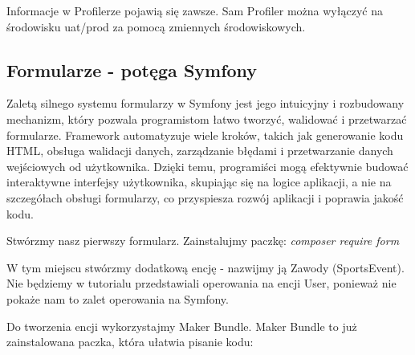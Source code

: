 \documentclass[polish, a4paper]{article}
\begin{document}
Informacje w Profilerze pojawią się zawsze. Sam Profiler można wyłączyć na środowisku uat/prod za pomocą zmiennych środowiskowych.

\subsection{Formularze - potęga Symfony}

Zaletą silnego systemu formularzy w Symfony jest jego intuicyjny i rozbudowany mechanizm, który pozwala programistom łatwo tworzyć, walidować i przetwarzać formularze. Framework automatyzuje wiele kroków, takich jak generowanie kodu HTML, obsługa walidacji danych, zarządzanie błędami i przetwarzanie danych wejściowych od użytkownika. Dzięki temu, programiści mogą efektywnie budować interaktywne interfejsy użytkownika, skupiając się na logice aplikacji, a nie na szczegółach obsługi formularzy, co przyspiesza rozwój aplikacji i poprawia jakość kodu.

Stwórzmy nasz pierwszy formularz. Zainstalujmy paczkę: \emph{composer require form}

W tym miejscu stwórzmy dodatkową encję - nazwijmy ją Zawody (SportsEvent). Nie będziemy w tutorialu przedstawiali operowania na encji User, ponieważ nie pokaże nam to zalet operowania na Symfony.

Do tworzenia encji wykorzystajmy Maker Bundle. Maker Bundle to już zainstalowana paczka, która ułatwia pisanie kodu:
\end{document}
